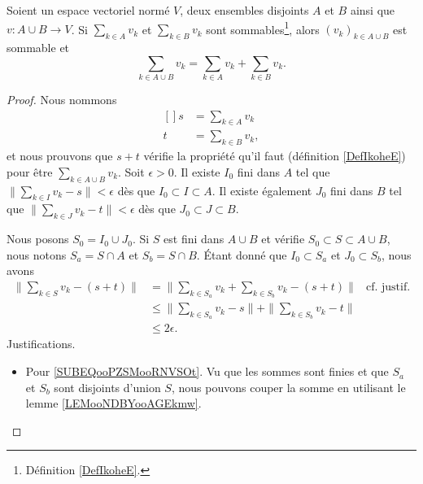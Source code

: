 \begin{proposition}      \label{PROPooJLQAooAEbIvZ}
	Soient un espace vectoriel normé \( V\), deux ensembles disjoints \( A\) et \( B\) ainsi que \( v\colon A\cup B\to V\). Si \( \sum_{k\in A}v_k\) et \( \sum_{k\in B}v_k\) sont sommables\footnote{Définition \ref{DefIkoheE}.}, alors \( (v_k)_{k\in A\cup B}\) est sommable et
	\begin{equation}
		\sum_{k\in A\cup B}v_k=\sum_{k\in A}v_k+\sum_{k\in B}v_k.
	\end{equation}
\end{proposition}

\begin{proof}
	Nous nommons
	\begin{equation}
		\begin{aligned}[]
			s & =\sum_{k\in A}v_k  \\
			t & =\sum_{k\in B}v_k,
		\end{aligned}
	\end{equation}
	et nous prouvons que \( s+t\) vérifie la propriété qu'il faut (définition \ref{DefIkoheE}) pour être \( \sum_{k\in A\cup B}v_k\). Soit \( \epsilon>0\). Il existe \( I_0\) fini dans \( A\) tel que \( \| \sum_{k\in I}v_k-s \|<\epsilon\) dès que \( I_0\subset I\subset A\). Il existe également \( J_0\) fini dans \( B\) tel que \( \| \sum_{k\in J}v_k-t \|<\epsilon\) dès que \( J_0\subset J\subset B\).

	Nous posons \( S_0=I_0\cup J_0\). Si \( S\) est fini dans \( A\cup B\) et vérifie \( S_0\subset S\subset A\cup B\), nous notons \( S_a=S\cap A\) et \( S_b=S\cap B\). Étant donné que \( I_0\subset S_a\) et \( J_0\subset S_b\), nous avons
	\begin{subequations}
		\begin{align}
			\| \sum_{k\in S}v_k-(s+t) \| & =\| \sum_{k\in S_a}v_k+\sum_{k\in S_b}v_k-(s+t) \|         & \text{cf. justif.} 	\label{SUBEQooPZSMooRNVSOt} \\
			                             & \leq \| \sum_{k\in S_a}v_k-s \|+\| \sum_{k\in S_b}v_k-t \|                                                   \\
			                             & \leq 2\epsilon.
		\end{align}
	\end{subequations}
	Justifications.
	\begin{itemize}
		\item
		      Pour \ref{SUBEQooPZSMooRNVSOt}. Vu que les sommes sont finies et que \( S_a\) et \( S_b\) sont disjoints d'union \( S\), nous pouvons couper la somme en utilisant le lemme \ref{LEMooNDBYooAGEkmw}.
	\end{itemize}
\end{proof}


